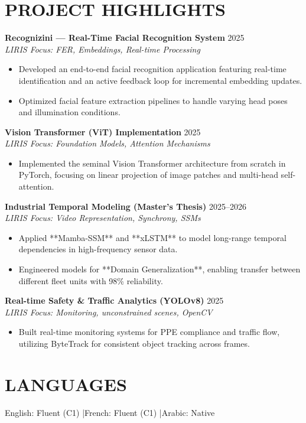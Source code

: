 \documentclass[a4paper,11pt]{article}
\begin{document}
\section{PROJECT HIGHLIGHTS}

\textbf{Recognizini — Real-Time Facial Recognition System} \hfill 2025 \\
\textit{LIRIS Focus: FER, Embeddings, Real-time Processing}
\begin{itemize}
    \item Developed an end-to-end facial recognition application featuring real-time identification and an active feedback loop for incremental embedding updates.
    \item Optimized facial feature extraction pipelines to handle varying head poses and illumination conditions.
\end{itemize}

\textbf{Vision Transformer (ViT) Implementation} \hfill 2025 \\
\textit{LIRIS Focus: Foundation Models, Attention Mechanisms}
\begin{itemize}
    \item Implemented the seminal Vision Transformer architecture from scratch in PyTorch, focusing on linear projection of image patches and multi-head self-attention.
\end{itemize}

\textbf{Industrial Temporal Modeling (Master's Thesis)} \hfill 2025--2026 \\
\textit{LIRIS Focus: Video Representation, Synchrony, SSMs}
\begin{itemize}
    \item Applied **Mamba-SSM** and **xLSTM** to model long-range temporal dependencies in high-frequency sensor data.
    \item Engineered models for **Domain Generalization**, enabling transfer between different fleet units with 98\% reliability.
\end{itemize}

\textbf{Real-time Safety \& Traffic Analytics (YOLOv8)} \hfill 2025 \\
\textit{LIRIS Focus: Monitoring, unconstrained scenes, OpenCV}
\begin{itemize}
    \item Built real-time monitoring systems for PPE compliance and traffic flow, utilizing ByteTrack for consistent object tracking across frames.
\end{itemize}

\section{LANGUAGES}
English: Fluent (C1) \quad|\quad French: Fluent (C1) \quad|\quad Arabic: Native
\end{document}
